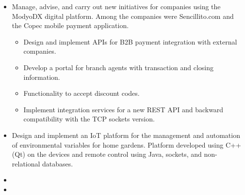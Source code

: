 \documentclass[11pt,letterpaper,sans]{moderncv}        %
\begin{document}
\begin{itemize}
\vspace{6pt}

\item{
{\vspace{3pt}
Manage, advise, and carry out new initiatives for companies using the ModyoDX digital platform. Among the companies were Sencillito.com and the Copec mobile payment application.
\begin{itemize}
\item Design and implement APIs for B2B payment integration with external companies.
\item Develop a portal for branch agents with transaction and closing information.
\item Functionality to accept discount codes.
\item Implement integration services for a new REST API and backward compatibility with the TCP sockets version.
\end{itemize}
}}

\vspace{6pt}

\item{
{\vspace{3pt}
Design and implement an IoT platform for the management and automation of environmental variables for home gardens. Platform developed using C++ (Qt) on the devices and remote control using Java, sockets, and non-relational databases.
}}

\vspace{6pt}

\item{}

\vspace{6pt}

\item{}

\vspace{6pt}


\end{itemize}
\end{document}
